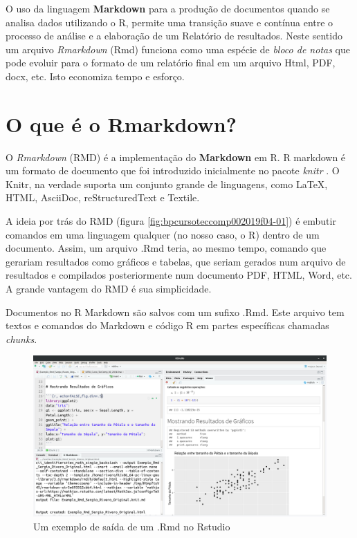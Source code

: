 \documentclass[12pt,a4paper,oneside]{erdc}
\begin{document}
	O uso da linguagem \textbf{Markdown} para a produção de documentos quando se analisa dados utilizando o R, permite uma transição suave e contínua entre o processo de análise e a elaboração de um Relatório de resultados. Neste sentido um arquivo \textit{Rmarkdown} (Rmd) funciona como uma espécie de \textit{bloco de notas} que pode evoluir para o formato de um relatório final em um arquivo Html, PDF, docx, etc. Isto economiza tempo e esforço. 
	
	
	\section{O que é o Rmarkdown?}
	
	O \textit{Rmarkdown} (RMD) é a implementação do \textbf{Markdown} em R. R markdown \cite{Allaire2016} é um formato de documento  que foi introduzido inicialmente no pacote \textit{knitr} \cite{Xie2016,Xie2017}. O Knitr, na verdade suporta um conjunto grande de linguagens, como \LaTeX, HTML, AsciiDoc, reStructuredText e Textile.
	
	A ideia por trás do RMD (figura \ref{fig:bpcursoteccomp002019f04-01}) é embutir comandos em uma linguagem qualquer (no nosso caso, o R) dentro de um documento. Assim, um arquivo .Rmd teria, ao mesmo tempo, comando que gerariam resultados como gráficos e tabelas, que seriam gerados num arquivo de resultados e compilados posteriormente num documento PDF, HTML, Word, etc.  A grande vantagem do RMD é sua simplicidade.
	
	Documentos no R Markdown são salvos com um sufixo .Rmd. Este arquivo tem textos e comandos do Markdown e código R em partes específicas chamadas \textit{chunks}.
	
	
		\begin{figure}
		\centering
		\includegraphics[width=\linewidth]{../figs/BP_Curso_TecComp_00_2019_f04-03}
		\caption{Um exemplo de saída de um .Rmd no Rstudio}
		\label{fig:bpcursoteccomp002019f04-03}
	\end{figure}	
	
\end{document}

